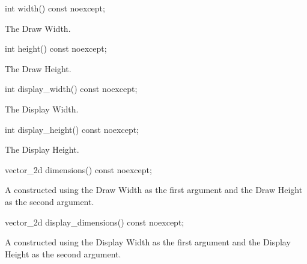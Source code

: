\begin{itemdecl}
int width() const noexcept;
\end{itemdecl}
\begin{itemdescr}
\pnum
\returns
The Draw Width.
\end{itemdescr}

\begin{itemdecl}
int height() const noexcept;
\end{itemdecl}
\begin{itemdescr}
\pnum
\returns
The Draw Height.
\end{itemdescr}

\begin{itemdecl}
int display_width() const noexcept;
\end{itemdecl}
\begin{itemdescr}
\pnum
\returns
The Display Width.
\end{itemdescr}

\begin{itemdecl}
int display_height() const noexcept;
\end{itemdecl}
\begin{itemdescr}
\pnum
\returns
The Display Height.
\end{itemdescr}

\begin{itemdecl}
vector_2d dimensions() const noexcept;
\end{itemdecl}
\begin{itemdescr}
\pnum
\returns
A  constructed using the Draw Width as the first argument and the Draw Height as the second argument.
\end{itemdescr}

\begin{itemdecl}
vector_2d display_dimensions() const noexcept;
\end{itemdecl}
\begin{itemdescr}
\pnum
\returns
A  constructed using the Display Width as the first argument and the Display Height as the second argument.
\end{itemdescr}

